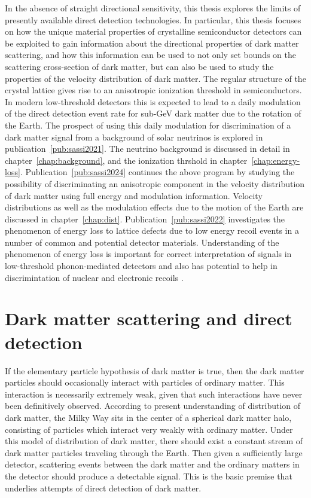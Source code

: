 \documentclass[b5paper, 10pt, twoside]{book}
\begin{document}
In the absence of straight directional sensitivity, this thesis explores the limits of presently available direct detection technologies. In particular, this thesis focuses on how the unique material properties of crystalline semiconductor detectors can be exploited to gain information about the directional properties of dark matter scattering, and how this information can be used to not only set bounds on the scattering cross-section of dark matter, but can also be used to study the properties of the velocity distribution of dark matter. The regular structure of the crystal lattice gives rise to an anisotropic ionization threshold in semiconductors. In modern low-threshold detectors this is expected to lead to a daily modulation of the direct detection event rate for sub-GeV dark matter due to the rotation of the Earth. The prospect of using this daily modulation for discrimination of a dark matter signal from a background of solar neutrinos is explored in publication~\ref{pub:sassi2021}. The neutrino background is discussed in detail in chapter~\ref{chap:background}, and the ionization thrshold in chapter~\ref{chap:energy-loss}. Publication~\ref{pub:sassi2024} continues the above program by studying the possibility of discriminating an anisotropic component in the velocity distribution of dark matter using full energy and modulation information. Velocity distributions as well as the modulation effects due to the motion of the Earth are discussed in chapter~\ref{chap:dist}. Publication~\ref{pub:sassi2022} investigates the phenomenon of energy loss to lattice defects due to low energy recoil events in a number of common and potential detector materials. Understanding of the phenomenon of energy loss is important for correct interpretation of signals in low-threshold phonon-mediated detectors and also has potential to help in discrimintation of nuclear and electronic recoils \parencite{HeikinheimoEtAl2022}.

\chapter{Dark matter scattering and direct detection}
\label{chap:direct-detection}

If the elementary particle hypothesis of dark matter is true, then the dark matter particles should occasionally interact with particles of ordinary matter. This interaction is necessarily extremely weak, given that such interactions have never been definitively observed. According to present understanding of distribution of dark matter, the Milky Way sits in the center of a spherical dark matter halo, consisting of particles which interact very weakly with ordinary matter. Under this model of distribution of dark matter, there should exist a constant stream of dark matter particles traveling through the Earth. Then given a sufficiently large detector, scattering events between the dark matter and the ordinary matters in the detector should produce a detectable signal. This is the basic premise that underlies attempts of direct detection of dark matter.
\end{document}
